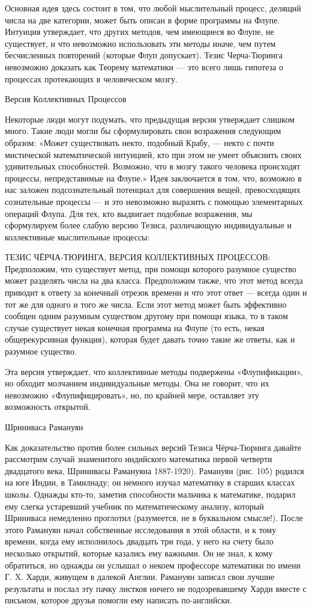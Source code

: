 \documentclass[../main.tex]{subfiles}
\begin{document}
Основная идея здесь состоит в том, что любой мыслительный процесс, делящий числа на две категории, может быть описан в форме программы на Флупе. Интуиция утверждает, что других методов, чем имеющиеся во Флупе, не существует, и что невозможно использовать эти методы иначе, чем путем бесчисленных повторений (которые Флуп допускает). Тезис Черча-Тюринга невозможно доказать как Теорему математики --- это всего лишь гипотеза о процессах протекающих в человеческом мозгу.

Версия Коллективных Процессов

Некоторые люди могут подумать, что предыдущая версия утверждает слишком много. Такие люди могли бы сформулировать свои возражения следующим образом: «Может существовать некто, подобный Крабу, --- некто с почти мистической математической интуицией, кто при этом не умеет объяснить своих удивительных способностей. Возможно, что в мозгу такого человека происходят процессы, непредставимые на Флупе.» Идея заключается в том, что, возможно в нас заложен подсознательный потенциал для совершения вещей, превосходящих сознательные процессы --- и это невозможно выразить с помощью элементарных операций Флупа. Для тех, кто выдвигает подобные возражения, мы сформулируем более слабую версию Тезиса, различающую индивидуальные и коллективные мыслительные процессы:

ТЕЗИС ЧЁРЧА-ТЮРИНГА, ВЕРСИЯ КОЛЛЕКТИВНЫХ ПРОЦЕССОВ: Предположим, что существует метод, при помощи которого разумное существо может разделять числа на два класса. Предположим также, что этот метод всегда приводит к ответу за конечный отрезок времени и что этот ответ --- всегда один и тот же для одного и того же числа. Если этот метод может быть эффективно сообщен одним разумным существом другому при помощи языка, то в таком случае существует некая конечная программа на Флупе (то есть, некая общерекурсивная функция), которая будет давать точно такие же ответы, как и разумное существо.

Эта версия утверждает, что коллективные методы подвержены «Флупификации», но обходит молчанием индивидуальные методы. Она не говорит, что их невозможно «Флупифицировать», но, по крайней мере, оставляет эту возможность открытой.

Шриниваса Рамануян

Как доказательство против более сильных версий Тезиса Чёрча-Тюринга давайте рассмотрим случай знаменитого индийского математика первой четверти двадцатого века, Шринивасы Рамануяна 1887-1920). Рамануян (рис. 105) родился на юге Индии, в Тамилнаду; он немного изучал математику в старших классах школы. Однажды кто-то, заметив способности мальчика к математике, подарил ему слегка устаревший учебник по математическому анализу, который Шриниваса немедленно проглотил (разумеется, не в буквальном смысле!). После этого Рамануян начал собственные исследования в этой области, и к тому времени, когда ему исполнилось двадцать три года, у него на счету было несколько открытий, которые казались ему важными. Он не знал, к кому обратиться, но однажды он услышал о некоем профессоре математики по имени Г. X. Харди, живущем в далекой Англии. Рамануян записал свои лучшие результаты и послал эту пачку листков ничего не подозревавшему Харди вместе с письмом, которое друзья помогли ему написать по-английски.
\end{document}
